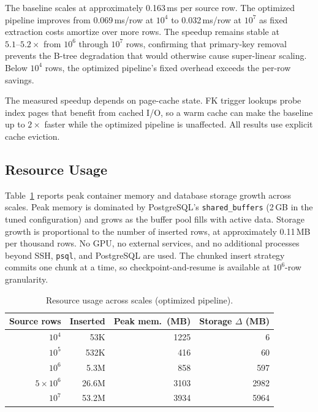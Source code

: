 \documentclass[journal]{IEEEtran}
\begin{document}
The baseline scales at approximately 0.163\,ms per source row.
The optimized pipeline improves from 0.069\,ms/row at $10^4$ to 0.032\,ms/row at $10^7$ as fixed extraction costs amortize over more rows.
The speedup remains stable at $5.1\text{--}5.2\times$ from $10^6$ through $10^7$ rows, confirming that primary-key removal prevents the B-tree degradation that would otherwise cause super-linear scaling.
Below $10^4$ rows, the optimized pipeline's fixed overhead exceeds the per-row savings.

The measured speedup depends on page-cache state.
FK trigger lookups probe index pages that benefit from cached I/O, so a warm cache can make the baseline up to $2\times$ faster while the optimized pipeline is unaffected.
All results use explicit cache eviction.

\subsection{Resource Usage}

Table~\ref{tab:resources} reports peak container memory and database storage growth across scales.
Peak memory is dominated by PostgreSQL's \texttt{shared\_buffers} (2\,GB in the tuned configuration) and grows as the buffer pool fills with active data.
Storage growth is proportional to the number of inserted rows, at approximately 0.11\,MB per thousand rows.
No GPU, no external services, and no additional processes beyond SSH, \texttt{psql}, and PostgreSQL are used.
The chunked insert strategy commits one chunk at a time, so checkpoint-and-resume is available at $10^6$-row granularity.

\begin{table}[!ht]
\centering
\caption{Resource usage across scales (optimized pipeline).}
\label{tab:resources}
\begin{tabular}{rrrr}
\toprule
\textbf{Source rows} & \textbf{Inserted} & \textbf{Peak mem.\ (MB)} & \textbf{Storage $\Delta$ (MB)} \\
\midrule
$10^4$          & 53K   & 1225  & 6    \\
$10^5$          & 532K  & 416   & 60   \\
$10^6$          & 5.3M  & 858   & 597  \\
$5 \times 10^6$ & 26.6M & 3103  & 2982 \\
$10^7$          & 53.2M & 3934  & 5964 \\
\bottomrule
\end{tabular}
\end{table}
\end{document}
